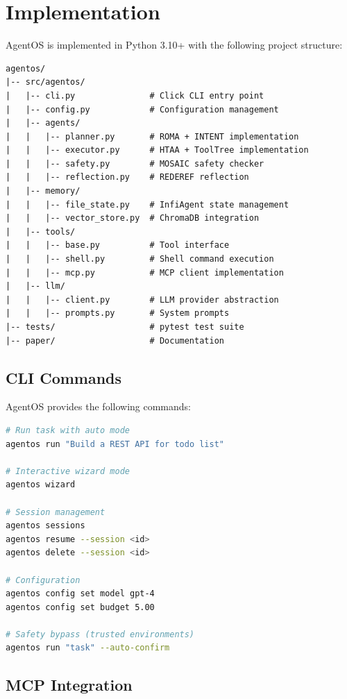 \documentclass[11pt,a4paper]{article}
\begin{document}
\section{Implementation}

AgentOS is implemented in Python 3.10+ with the following project structure:

\begin{verbatim}
agentos/
|-- src/agentos/
|   |-- cli.py               # Click CLI entry point
|   |-- config.py            # Configuration management
|   |-- agents/
|   |   |-- planner.py       # ROMA + INTENT implementation
|   |   |-- executor.py      # HTAA + ToolTree implementation
|   |   |-- safety.py        # MOSAIC safety checker
|   |   |-- reflection.py    # REDEREF reflection
|   |-- memory/
|   |   |-- file_state.py    # InfiAgent state management
|   |   |-- vector_store.py  # ChromaDB integration
|   |-- tools/
|   |   |-- base.py          # Tool interface
|   |   |-- shell.py         # Shell command execution
|   |   |-- mcp.py           # MCP client implementation
|   |-- llm/
|   |   |-- client.py        # LLM provider abstraction
|   |   |-- prompts.py       # System prompts
|-- tests/                   # pytest test suite
|-- paper/                   # Documentation
\end{verbatim}

\subsection{CLI Commands}

AgentOS provides the following commands:

\begin{lstlisting}[language=bash, style=pystyle]
# Run task with auto mode
agentos run "Build a REST API for todo list"

# Interactive wizard mode
agentos wizard

# Session management
agentos sessions
agentos resume --session <id>
agentos delete --session <id>

# Configuration
agentos config set model gpt-4
agentos config set budget 5.00

# Safety bypass (trusted environments)
agentos run "task" --auto-confirm
\end{lstlisting}

\subsection{MCP Integration}
\end{document}

